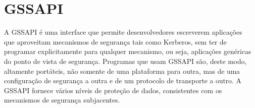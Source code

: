 
\section{GSSAPI}

A GSSAPI é uma interface que permite desenvolvedores escreverem aplicações que aproveitam mecanismos de segurança tais como Kerberos, sem ter de programar explicitamente para qualquer mecanismo, ou seja, aplicações genéricas do ponto de vista de segurança. Programas que usam GSSAPI são, deste modo, altamente portáteis, não somente de uma plataforma para outra, mas de uma configuração de segurança a outra e de um protocolo de transporte a outro. A GSSAPI fornece vários níveis de proteção de dados, consistentes com os mecanismos de segurança subjacentes.\cite{HUGO}



% 
% 
% 
% 
% 
% 
% 
% 
% 
% 
% 
% 
% 
% 






